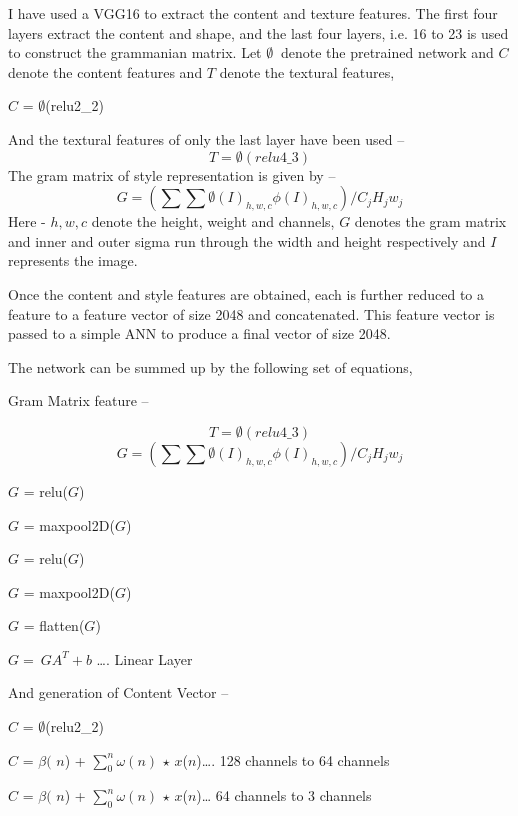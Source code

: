 \documentclass[]{article}
\begin{document}
 I have used a VGG16 to extract the content and texture features. The first four layers extract the content and shape, and the last four layers, i.e. 16 to 23 is used to construct the grammanian matrix. Let $\emptyset \ $ denote the pretrained network and $C$ denote the content features and $T$ denote the textural features, 

\textbf{ }$C$ = $\emptyset $(relu2\_2)

And the textural features of only the last layer have been used -- 
\[T = \emptyset (relu4\_3)\] 
The gram matrix of style representation is given by -- 
\[G=(\sum \sum \emptyset {\left(I\right)}_{h,w,c}\phi {\left(I\right)}_{h,w,c})/C_jH_jw_j\] 
Here - $h,w,c$ denote the height, weight and channels, $G$ denotes the gram matrix and inner and outer sigma run through the width and height respectively and  $I$ represents the image. 

Once the content and style features are obtained, each is further reduced to a feature to a feature vector of size 2048 and concatenated. This feature vector is passed to a simple ANN to produce a final vector of size 2048. 

The network can be summed up by the following set of equations, 
\bigskip

\noindent Gram Matrix feature -- 
\bigskip
\bigskip
\begin{center}
\[T = \emptyset (relu4\_3)\] 
\[G=(\sum \sum \emptyset {\left(I\right)}_{h,w,c}\phi {\left(I\right)}_{h,w,c})/C_jH_jw_j\] 

$G$ = relu($G$)

$G$ = maxpool2D($G$)

$G$ = relu($G$)

$G$ = maxpool2D($G$) 

$G$  = flatten($G$)

$G{=\ GA}^T+b$ {\dots}.  Linear Layer
\end{center}

\bigskip
\bigskip
And generation of Content Vector -- 
\bigskip

\begin{center}
$C$ = $\emptyset $(relu2\_2)

$C$ = $\beta ($ $n$) + $\sum^n_0{\omega \left(n\right)}$ $\mathrm{\star }$ $x$($n$){\dots}. 128 channels to 64 channels

$C$ = $\beta ($ $n$) + $\sum^n_0{\omega \left(n\right)}$ $\mathrm{\star }$ $x$($n$){\dots} 64 channels to 3 channels 
\end{center}
\end{document}

